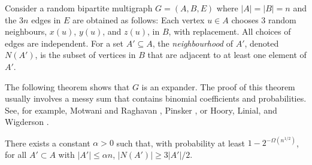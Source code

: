 \documentclass[lotsofwhite]{patmorin}
\begin{document}
Consider a random bipartite multigraph $G=(A,B,E)$ where $|A|=|B|=n$
and the $3n$ edges in $E$ are obtained as follows:  Each vertex $u\in A$
chooses 3 random neighbours, $x(u)$, $y(u)$, and $z(u)$, in $B$, with
replacement.  All choices of edges are independent. For a set $A'\subseteq
A$, the \emph{neighbourhood} of $A'$, denoted $N(A')$, is the subset of
vertices in $B$ that are adjacent to at least one element of $A'$.

The following theorem shows that $G$ is an expander.  The proof of
this theorem usually involves a messy sum that contains binomial
coefficients and probabilities.  See, for example, Motwani and
Raghavan \cite[Theorem~5.3]{motwani.raghavan:randomized}, Pinsker
\cite[Lemma 1]{pinsker:on}, or Hoory, Linial, and Wigderson
\cite[Lemma~1.9]{hoory.linial.ea:expander}.

\begin{thm}
  There exists a constant $\alpha >0$ such that, with probability at
  least $1-2^{-\Omega(n^{1/2})}$, for all $A'\subset A$ with $|A'|\le
  \alpha n$, $|N(A')| \ge 3|A'|/2$.
\end{thm}
\end{document}

